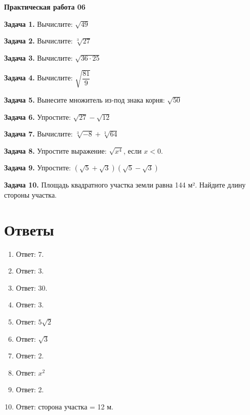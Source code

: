 \documentclass{umk-matematika}
\begin{document}
\begin{center}
{\Large\bfseries Практическая работа 06}
\end{center}
\vspace{0.5cm}

\textbf{Задача 1.} Вычислите: $\sqrt{49}$\par\vspace{10pt}
\textbf{Задача 2.} Вычислите: $\sqrt[3]{27}$\par\vspace{10pt}
\textbf{Задача 3.} Вычислите: $\sqrt{36 \cdot 25}$\par\vspace{10pt}
\textbf{Задача 4.} Вычислите: $\sqrt{\dfrac{81}{9}}$\par\vspace{10pt}
\textbf{Задача 5.} Вынесите множитель из-под знака корня: $\sqrt{50}$\par\vspace{10pt}
\textbf{Задача 6.} Упростите: $\sqrt{27} - \sqrt{12}$\par\vspace{10pt}
\textbf{Задача 7.} Вычислите: $\sqrt[3]{-8} + \sqrt[3]{64}$\par\vspace{10pt}
\textbf{Задача 8.} Упростите выражение: $\sqrt{x^4}$, если $x < 0$.\par\vspace{10pt}
\textbf{Задача 9.} Упростите: $(\sqrt{5} + \sqrt{3})(\sqrt{5} - \sqrt{3})$\par\vspace{10pt}
\textbf{Задача 10.} Площадь квадратного участка земли равна 144 м². Найдите длину стороны участка.\par\vspace{10pt}
\newpage
\section*{Ответы}

\begin{enumerate}
  \item Ответ: 7.
  \item Ответ: 3.
  \item Ответ: 30.
  \item Ответ: 3.
  \item Ответ: $5\sqrt{2}$
  \item Ответ: $\sqrt{3}$
  \item Ответ: 2.
  \item Ответ: $x^2$
  \item Ответ: 2.
  \item Ответ: сторона участка = 12 м.
\end{enumerate}
\end{document}
